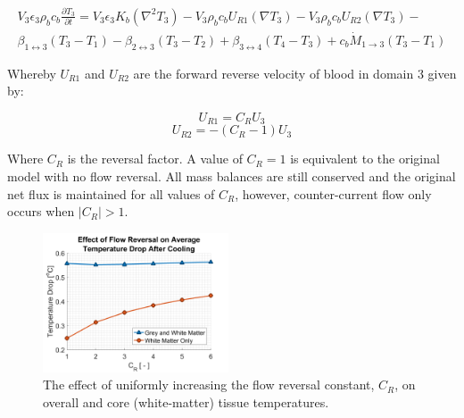 \documentclass[11pt,english,a4paper,twoside,openright]{report}
\begin{document}
{{{{{{{\begin{multline}
\label{Eq:Thermal3R}
V_{3}\epsilon_{3}\rho_{b}c_{b}\frac{\partial T_{3}}{\partial t}=V_{3}\epsilon_{3}K_{b}(\nabla^{2}T_{3})-V_{3}\rho_{b}c_{b}U_{R1}(\nabla T_{3})-V_{3}\rho_{b}c_{b}U_{R2}(\nabla T_{3})-\\\beta_{1\leftrightarrow3}(T_{3}-T_{1})-\beta_{2\leftrightarrow3}(T_{3}-T_{2})
+\beta_{3\leftrightarrow4}(T_{4}-T_{3})+c_{b}\dot{M}_{1\rightarrow3}(T_{3}-T_{1})
\end{multline}

Whereby $U_{R1}$ and $U_{R2}$ are the forward reverse velocity of blood in domain 3 given by:

\begin{equation}
\label{Eq:VelocityReversal1}
U_{R1}=C_{R}U_{3}
\end{equation}
\begin{equation}
\label{Eq:VelocityReversal2}
U_{R2}=-(C_{R}-1)U_{3}
\end{equation}

Where $C_{R}$ is the reversal factor. A value of $C_{R}=1$ is equivalent to the original model with no flow reversal. All mass balances are still conserved and the original net flux is maintained for all values of $C_{R}$, however, counter-current flow only occurs when $|C_{R}|{>}1$. 

\begin{figure}[h]
	\centering
	\includegraphics[width=0.49\textwidth]{Chapter5/Chapter5_Section2_ValidGraph}
	\caption[The effect of uniformly increasing the flow reversal constant, $C_{R}$, on overall and core (white-matter) tissue temperatures]{The effect of uniformly increasing the flow reversal constant, $C_{R}$, on overall and core (white-matter) tissue temperatures.}
	\label{fig:CounterCurrentGraph}
\end{figure}

}}}}}}}
\end{document}
